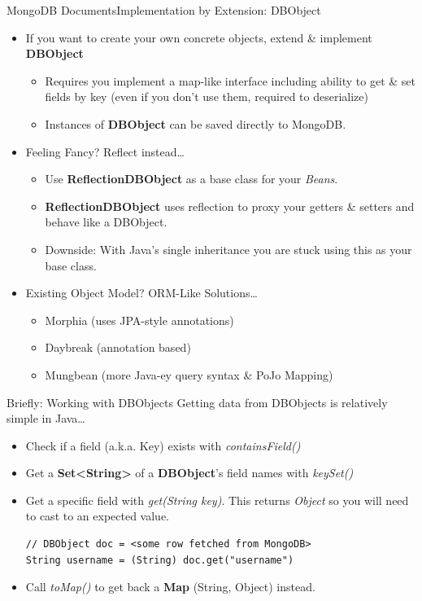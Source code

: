 \documentclass{beamer}
\begin{document}
\begin{frame}{MongoDB Documents}{Implementation by Extension: DBObject}
    \begin{itemize}
        \item<1-> If you want to create your own concrete objects, extend \& implement {\bf DBObject}
            \begin{itemize}
                \item Requires you implement a map-like interface including ability to get \& set fields by key (even if you don't use them, required to deserialize)
                \item Instances of {\bf DBObject} can be saved directly to MongoDB.
            \end{itemize}
        \item<2-> Feeling Fancy? Reflect instead\dots
            \begin{itemize}
                \item Use {\bf ReflectionDBObject} as a base class for your {\em Beans}.
                \item {\bf ReflectionDBObject} uses reflection to proxy your getters \& setters and behave like a DBObject.
                \item Downside: With Java's single inheritance you are stuck using this as your base class.
            \end{itemize}
        \item<3-> Existing Object Model? ORM-Like Solutions\ldots
            \begin{itemize}
                \item Morphia (uses JPA-style annotations)
                \item Daybreak (annotation based)
                \item Mungbean (more Java-ey query syntax \& PoJo Mapping)
            \end{itemize}
              
    \end{itemize}
\end{frame}

\begin{frame}[fragile]{Briefly: Working with DBObjects}
    Getting data from DBObjects is relatively simple in Java\ldots
    \begin{itemize}
        \item<2-> Check if a field (a.k.a. Key) exists with {\em containsField()}
        \item<3-> Get a {\bf Set<String>} of a {\bf DBObject}'s field names with {\em keySet()}
        \item<4-> Get a specific field with {\em get(String key)}.  This returns {\em Object} so you will need to cast to an expected value.
\begin{lstlisting}
// DBObject doc = <some row fetched from MongoDB>
String username = (String) doc.get("username")
\end{lstlisting}
        \item<5-> Call {\em toMap()} to get back a {\bf Map} (String, Object) instead.
    \end{itemize}
\end{frame}
\end{document}
